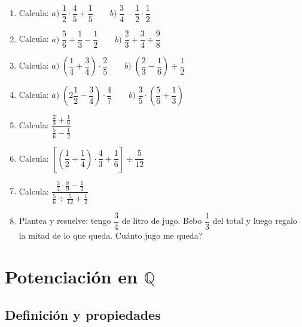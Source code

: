 \documentclass[12pt, letterpaper]{article}
\newcommand{\Q}{\mathbb{Q}}
\begin{document}
\begin{enumerate}[leftmargin=*]
  \item \facil{} Calcula: $a)\; \dfrac{1}{2} \cdot \dfrac{4}{5} + \dfrac{1}{5} \qquad b)\; \dfrac{3}{4} - \dfrac{1}{2} \cdot \dfrac{1}{2}$

  \item \facil{} Calcula: $a)\; \dfrac{5}{6} \div \dfrac{1}{3} - \dfrac{1}{2} \qquad b)\; \dfrac{2}{3} + \dfrac{3}{4} \div \dfrac{9}{8}$

  \item \medio{} Calcula: $a)\; \left(\dfrac{1}{4} + \dfrac{3}{4}\right) \cdot \dfrac{2}{5} \qquad b)\; \left(\dfrac{2}{3} - \dfrac{1}{6}\right) \div \dfrac{1}{2}$

  \item \medio{} Calcula: $a)\; \left(2\dfrac{1}{2} - \dfrac{3}{4}\right) \cdot \dfrac{4}{7} \qquad b)\; \dfrac{3}{5} \cdot \left(\dfrac{5}{6} + \dfrac{1}{3}\right)$

  \item \medio{} Calcula: $\dfrac{\frac{2}{3} + \frac{1}{6}}{\frac{5}{6} - \frac{1}{2}}$

  \item \medio{} Calcula: $\left[\left(\dfrac{1}{2} + \dfrac{1}{4}\right) \cdot \dfrac{4}{3} + \dfrac{1}{6}\right] \div \dfrac{5}{12}$

  \item \dificil{} Calcula: $\dfrac{\frac{3}{4} \cdot \frac{8}{9} - \frac{1}{3}}{\frac{5}{6} \div \frac{5}{12} + \frac{1}{2}}$

  \item \dificil{} Plantea y resuelve: tengo $\dfrac{3}{4}$ de litro de jugo. Bebo $\dfrac{1}{3}$ del total y luego regalo la mitad de lo que queda. \textquestiondown Cuánto jugo me queda?
\end{enumerate}

\newpage

\section{Potenciación en $\Q$}

\subsection{Definición y propiedades}
\end{document}
